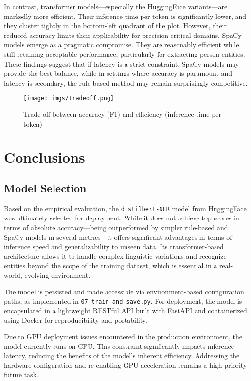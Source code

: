 In contrast, transformer models—especially the HuggingFace variants—are markedly more efficient. Their inference time per token is significantly lower, and they cluster tightly in the bottom-left quadrant of the plot. However, their reduced accuracy limits their applicability for precision-critical domains. SpaCy models emerge as a pragmatic compromise. They are reasonably efficient while still retaining acceptable performance, particularly for extracting person entities. These findings suggest that if latency is a strict constraint, SpaCy models may provide the best balance, while in settings where accuracy is paramount and latency is secondary, the rule-based method may remain surprisingly competitive.




\begin{figure}[htb]
    \centering
    \texttt{[image: imgs/tradeoff.png]}
    \caption{Trade-off between accuracy (F1) and efficiency (inference time per token)}
    \label{fig:tradeoff}
\end{figure}


\chapter{Conclusions}
\label{ch:Conclusion}

\section{Model Selection}

Based on the empirical evaluation, the \texttt{distilbert-NER} model from HuggingFace was ultimately selected for deployment. While it does not achieve top scores in terms of absolute accuracy—being outperformed by simpler rule-based and SpaCy models in several metrics—it offers significant advantages in terms of inference speed and generalizability to unseen data. Its transformer-based architecture allows it to handle complex linguistic variations and recognize entities beyond the scope of the training dataset, which is essential in a real-world, evolving environment.

The model is persisted and made accessible via environment-based configuration paths, as implemented in \texttt{07\_train\_and\_save.py}. For deployment, the model is encapsulated in a lightweight RESTful API built with FastAPI and containerized using Docker for reproducibility and portability.

Due to GPU deployment issues encountered in the production environment, the model currently runs on CPU. This constraint significantly impacts inference latency, reducing the benefits of the model’s inherent efficiency. Addressing the hardware configuration and re-enabling GPU acceleration remains a high-priority future task.

